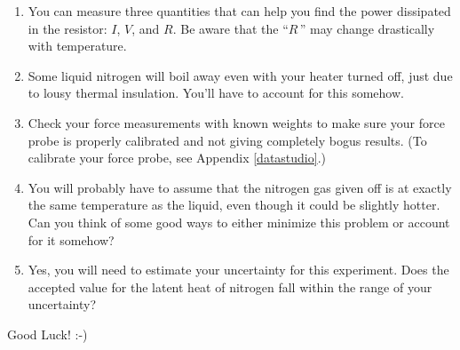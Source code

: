 \begin{enumerate}

\item You can measure three quantities that can help you find the power
dissipated in the resistor: $I$, $V$, and $R$. Be aware that the ``$\!R\,$'' may change drastically with temperature.

\item Some liquid nitrogen will boil away even with your heater turned off, just due to lousy thermal insulation. You'll have to account for this somehow.

\item Check your force measurements with known weights to make sure your force probe is properly calibrated and not giving completely bogus results.  (To calibrate your force probe, see Appendix \ref{datastudio}.) 

\item You will probably have to assume that the nitrogen gas given off is at exactly the same temperature as the liquid, even though it could be slightly hotter. Can you think of some good ways to either minimize this problem or account for it somehow?

\item Yes, you will need to estimate your uncertainty for this experiment. Does the accepted value for the latent heat of nitrogen fall within the range of your uncertainty?

\end{enumerate}

Good Luck!  :-)
